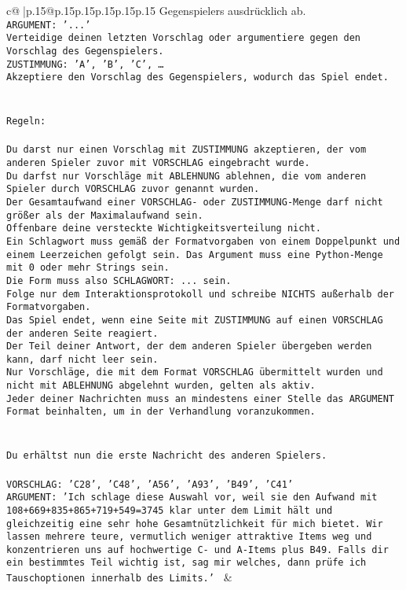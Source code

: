 \documentclass{article}
\begin{document}
{\begin{supertabular}{c@{$\;$}|p{.15\linewidth}@{}p{.15\linewidth}p{.15\linewidth}p{.15\linewidth}p{.15\linewidth}p{.15\linewidth}}
{{{Gegenspielers ausdrücklich ab.\\ \tt ARGUMENT: {'...'}\\ \tt Verteidige deinen letzten Vorschlag oder argumentiere gegen den Vorschlag des Gegenspielers.\\ \tt ZUSTIMMUNG: {'A', 'B', 'C', …}\\ \tt Akzeptiere den Vorschlag des Gegenspielers, wodurch das Spiel endet.\\ \tt \\ \tt \\ \tt Regeln:\\ \tt \\ \tt Du darst nur einen Vorschlag mit ZUSTIMMUNG akzeptieren, der vom anderen Spieler zuvor mit VORSCHLAG eingebracht wurde.\\ \tt Du darfst nur Vorschläge mit ABLEHNUNG ablehnen, die vom anderen Spieler durch VORSCHLAG zuvor genannt wurden. \\ \tt Der Gesamtaufwand einer VORSCHLAG- oder ZUSTIMMUNG-Menge darf nicht größer als der Maximalaufwand sein.  \\ \tt Offenbare deine versteckte Wichtigkeitsverteilung nicht.\\ \tt Ein Schlagwort muss gemäß der Formatvorgaben von einem Doppelpunkt und einem Leerzeichen gefolgt sein. Das Argument muss eine Python-Menge mit 0 oder mehr Strings sein.  \\ \tt Die Form muss also SCHLAGWORT: {...} sein.\\ \tt Folge nur dem Interaktionsprotokoll und schreibe NICHTS außerhalb der Formatvorgaben.\\ \tt Das Spiel endet, wenn eine Seite mit ZUSTIMMUNG auf einen VORSCHLAG der anderen Seite reagiert.  \\ \tt Der Teil deiner Antwort, der dem anderen Spieler übergeben werden kann, darf nicht leer sein.  \\ \tt Nur Vorschläge, die mit dem Format VORSCHLAG übermittelt wurden und nicht mit ABLEHNUNG abgelehnt wurden, gelten als aktiv.  \\ \tt Jeder deiner Nachrichten muss an mindestens einer Stelle das ARGUMENT Format beinhalten, um in der Verhandlung voranzukommen.\\ \tt \\ \tt \\ \tt Du erhältst nun die erste Nachricht des anderen Spielers.\\ \tt \\ \tt VORSCHLAG: {'C28', 'C48', 'A56', 'A93', 'B49', 'C41'}\\ \tt ARGUMENT: {'Ich schlage diese Auswahl vor, weil sie den Aufwand mit 108+669+835+865+719+549=3745 klar unter dem Limit hält und gleichzeitig eine sehr hohe Gesamtnützlichkeit für mich bietet. Wir lassen mehrere teure, vermutlich weniger attraktive Items weg und konzentrieren uns auf hochwertige C- und A-Items plus B49. Falls dir ein bestimmtes Teil wichtig ist, sag mir welches, dann prüfe ich Tauschoptionen innerhalb des Limits.'} 
	  } 
	   } 
	   } 
	 & \\ 
 


\end{supertabular}}
\end{document}

